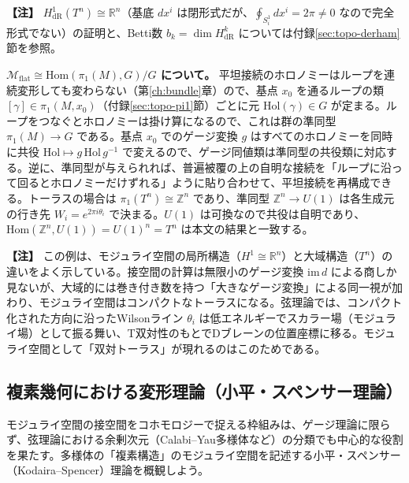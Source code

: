 \documentclass[uplatex, dvipdfmx, book]{jsbook}
\let\origsubsection\subsection
\let\origsubsubsection\subsubsection
\renewcommand{\section}{\origsubsection}
\renewcommand{\subsection}{\origsubsubsection}
\renewcommand{\subsubsection}{\paragraph}
\newenvironment{note}{\vspace{1ex}\par\footnotesize\noindent\textbf{【注】}}{\par\vspace{1ex}}
\begin{document}
\begin{note}
$H^1_{\mathrm{dR}}(T^n) \cong \mathbb{R}^n$（基底 $dx^i$ は閉形式だが、$\oint_{S^1_i} dx^i = 2\pi \neq 0$ なので完全形式でない）の証明と、Betti数 $b_k = \dim H^k_{\mathrm{dR}}$ については付録\ref{sec:topo-derham}節を参照。

\textbf{$\mathcal{M}_{\text{flat}} \cong \mathrm{Hom}(\pi_1(M), G)/G$ について。}
平坦接続のホロノミーはループを連続変形しても変わらない（第\ref{ch:bundle}章）ので、基点 $x_0$ を通るループの類 $[\gamma] \in \pi_1(M, x_0)$（付録\ref{sec:topo-pi1}節）ごとに元 $\mathrm{Hol}(\gamma) \in G$ が定まる。ループをつなぐとホロノミーは掛け算になるので、これは群の準同型 $\pi_1(M) \to G$ である。基点 $x_0$ でのゲージ変換 $g$ はすべてのホロノミーを同時に共役 $\mathrm{Hol} \mapsto g\,\mathrm{Hol}\,g^{-1}$ で変えるので、ゲージ同値類は準同型の共役類に対応する。逆に、準同型が与えられれば、普遍被覆の上の自明な接続を「ループに沿って回るとホロノミーだけずれる」ように貼り合わせて、平坦接続を再構成できる。トーラスの場合は $\pi_1(T^n) \cong \mathbb{Z}^n$ であり、準同型 $\mathbb{Z}^n \to U(1)$ は各生成元の行き先 $W_i = e^{2\pi i \theta_i}$ で決まる。$U(1)$ は可換なので共役は自明であり、$\mathrm{Hom}(\mathbb{Z}^n, U(1)) = U(1)^n = T^n$ は本文の結果と一致する。
\end{note}

\begin{note}
この例は、モジュライ空間の局所構造（$H^1 \cong \mathbb{R}^n$）と大域構造（$T^n$）の違いをよく示している。接空間の計算は無限小のゲージ変換 $\mathrm{im}\, d$ による商しか見ないが、大域的には巻き付き数を持つ「大きなゲージ変換」による同一視が加わり、モジュライ空間はコンパクトなトーラスになる。弦理論では、コンパクト化された方向に沿ったWilsonライン $\theta_i$ は低エネルギーでスカラー場（モジュライ場）として振る舞い、T双対性のもとでDブレーンの位置座標に移る。モジュライ空間として「双対トーラス」が現れるのはこのためである。
\end{note}

\section{複素幾何における変形理論（小平・スペンサー理論）}

モジュライ空間の接空間をコホモロジーで捉える枠組みは、ゲージ理論に限らず、弦理論における余剰次元（Calabi--Yau多様体など）の分類でも中心的な役割を果たす。多様体の「複素構造」のモジュライ空間を記述する小平・スペンサー（Kodaira--Spencer）理論\cite{kodairaspencer1958}を概観しよう。
\end{document}
